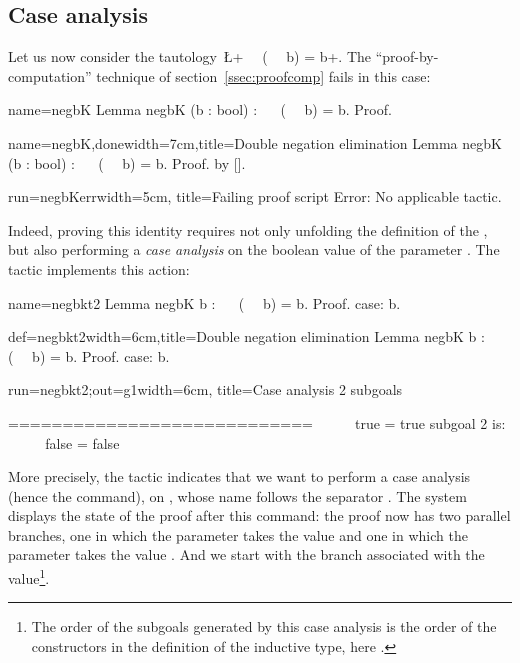 \subsection{Case analysis}\label{ssec:case}
Let us now consider the tautology~\L+~~ (~~ b) = b+. The
``proof-by-computation'' technique of section~\ref{ssec:proofcomp}
fails in this case:

\begin{coqdef}{name=negbK}
Lemma negbK (b : bool) : ~~ (~~ b) = b.
Proof.
\end{coqdef}
\begin{coq}{name=negbK,done}{width=7cm,title=Double negation elimination}
Lemma negbK (b : bool) : ~~ (~~ b) = b.
Proof. by [].
\end{coq}
\begin{coqout}{run=negbKerr}{width=5cm, title=Failing proof script}
Error: No applicable tactic.
\end{coqout}

Indeed, proving this identity requires not only unfolding the
definition of the , but also performing a \emph{case analysis}
on the boolean value of the parameter . The tactic 
implements this action:

\begin{coqdef}{name=negbkt2}
Lemma negbK b : ~~ (~~ b) = b.
Proof.
case: b.
\end{coqdef}
\begin{coq}{def=negbkt2}{width=6cm,title=Double negation elimination}
Lemma negbK b : ~~ (~~ b) = b.
Proof.
case: b.
$~$
$~$
$~$
\end{coq}
\begin{coqout}{run=negbkt2;out=g1}{width=6cm, title=Case analysis}
2 subgoals

  ============================
   ~~ ~~ true = true
subgoal 2 is:
 ~~ ~~ false = false
\end{coqout}

More precisely, the tactic  indicates that we want to
perform a case analysis (hence the  command), on , whose
name follows the separator \C{:}. The \Coq{} system displays the state
of the proof after this command: the proof now has two parallel
branches, one in which the parameter  takes the value  and
one in which the parameter  takes the value . And we
start with the branch associated with the 
value\footnote{The order of the subgoals generated by this case
  analysis is the order of the constructors in the definition of the
  inductive type, here .}.

